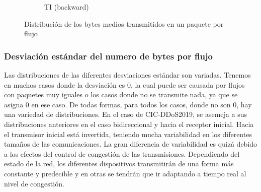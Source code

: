 \begin{figure}[H]
\begin{subfigure}[b]{0.26\textwidth}
        \caption{TI (backward)}
    \end{subfigure}
    \hfill
       \caption{Distribución de los bytes medios transmitidos en un paquete por flujo}
       \label{fig:packet_pincer_packet_bytes_mean}
\end{figure}

\subsubsection{Desviación estándar del numero de bytes por flujo}

Las distribuciones de las diferentes desviaciones estándar son variadas. Tenemos en muchos casos donde la desviación es 0, la cual puede ser causada por flujos con paquetes muy iguales o los casos donde no se transmite nada, ya que se asigna 0 en ese caso. De todas formas, para todos los casos, donde no son 0, hay una variedad de distribuciones. En el caso de CIC-DDoS2019, se asemeja a sus distribuciones anteriores en el caso bidireccional y hacia el receptor inicial. Hacia el transmisor inicial está invertida, teniendo mucha variabilidad en los diferentes tamaños de las comunicaciones. La gran diferencia de variabilidad es quizá debido a los efectos del control de congestión de las transmisiones. Dependiendo del estado de la red, los diferentes dispositivos transmitirán de una forma más constante y predecible y en otras se tendrán que ir adaptando a tiempo real al nivel de congestión.

